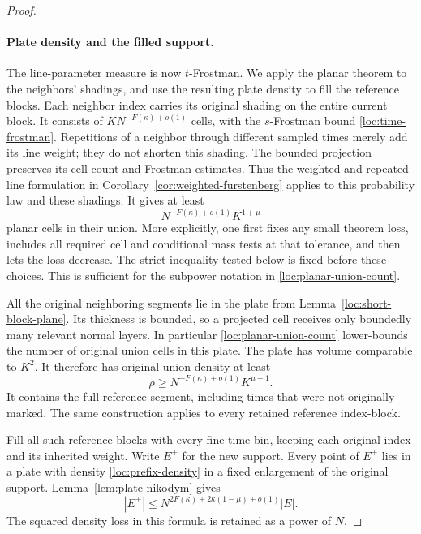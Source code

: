 \begin{proof}
\paragraph{Plate density and the filled support.}
The line-parameter measure is now $t$-Frostman.  We apply the planar
theorem to the neighbors' shadings, and use the resulting plate
density to fill the reference blocks.
Each neighbor index carries its original shading on the entire
current block.  It consists of
$KN^{-F(\kappa)+o(1)}$ cells, with the $s$-Frostman bound
\eqref{loc:time-frostman}.  Repetitions of a neighbor through different
sampled times merely add its line weight; they do not shorten this
shading.  The bounded projection preserves its cell count and
Frostman estimates.  Thus the weighted and repeated-line formulation
in Corollary~\ref{cor:weighted-furstenberg} applies to this probability
law and these shadings.  It gives at least
\begin{equation}
 N^{-F(\kappa)+o(1)}K^{1+\mu}
 \label{loc:planar-union-count}
\end{equation}
planar cells in their union.  More explicitly, one first fixes any
small theorem loss, includes all required cell and conditional mass
tests at that tolerance, and then lets the loss decrease.  The
strict inequality tested below is fixed before these choices.  This
is sufficient for the subpower notation in
\eqref{loc:planar-union-count}.

All the original neighboring segments lie in the plate from
Lemma~\ref{loc:short-block-plane}.  Its thickness is bounded, so a
projected cell receives only boundedly many relevant normal layers.
In particular \eqref{loc:planar-union-count} lower-bounds the number
of original union cells in this plate.  The plate has volume
comparable to $K^2$.  It therefore has original-union density at least
\begin{equation}
 \rho\geq N^{-F(\kappa)+o(1)}K^{\mu-1}.
 \label{loc:prefix-density}
\end{equation}
It contains the full reference segment, including times that were
not originally marked.  The same construction applies to every
retained reference index-block.

Fill all such reference blocks with every fine time bin, keeping
each original index and its inherited weight.  Write $E^+$ for the
new support.  Every point of $E^+$ lies in a plate with density
\eqref{loc:prefix-density} in a fixed enlargement of the original
support.  Lemma~\ref{lem:plate-nikodym} gives
\begin{equation}
 |E^+|\leq
 N^{2F(\kappa)+2\kappa(1-\mu)+o(1)}|E|.
 \label{loc:prefix-support-cost}
\end{equation}
The squared density loss in this formula is retained as a power of
$N$.


\end{proof}
